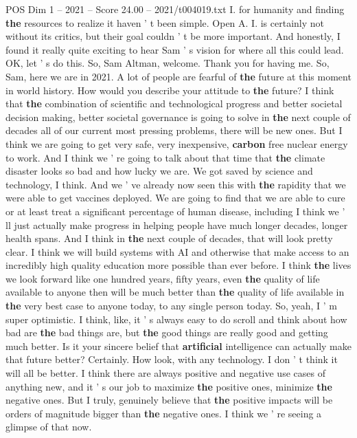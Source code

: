 \begin{textsample}{POS Dim 1 – 2021 – Score 24.00 – 2021/t004019.txt}
I. for humanity and finding \textbf{the} resources to realize it haven ' t been simple.
Open A.
I. is certainly not without its critics, but their goal couldn ' t be more important.
And honestly, I found it really quite exciting to hear Sam ' s vision for where all this could lead.
OK, let ' s do this.
So, Sam Altman, welcome.
Thank you for having me.
So, Sam, here we are in 2021.
A lot of people are fearful of \textbf{the} future at this moment in world history.
How would you describe your attitude to \textbf{the} future?
I think that \textbf{the} combination of scientific and technological progress and better societal decision making, better societal governance is going to solve in \textbf{the} next couple of decades all of our current most pressing problems, there will be new ones.
But I think we are going to get very safe, very inexpensive, \textbf{carbon} free nuclear energy to work.
And I think we ' re going to talk about that time that \textbf{the} climate disaster looks so bad and how lucky we are.
We got saved by science and technology, I think.
And we ' ve already now seen this with \textbf{the} rapidity that we were able to get vaccines deployed.
We are going to find that we are able to cure or at least treat a significant percentage of human disease, including I think we ' ll just actually make progress in helping people have much longer decades, longer health spans.
And I think in \textbf{the} next couple of decades, that will look pretty clear.
I think we will build systems with AI and otherwise that make access to an incredibly high quality education more possible than ever before.
I think \textbf{the} lives we look forward like one hundred years, fifty years, even \textbf{the} quality of life available to anyone then will be much better than \textbf{the} quality of life available in \textbf{the} very best case to anyone today, to any single person today.
So, yeah, I ' m super optimistic.
I think, like, it ' s always easy to do scroll and think about how bad are \textbf{the} bad things are, but \textbf{the} good things are really good and getting much better.
Is it your sincere belief that \textbf{artificial} intelligence can actually make that future better?
Certainly.
How look, with any technology.
I don ' t think it will all be better.
I think there are always positive and negative use cases of anything new, and it ' s our job to maximize \textbf{the} positive ones, minimize \textbf{the} negative ones.
But I truly, genuinely believe that \textbf{the} positive impacts will be orders of magnitude bigger than \textbf{the} negative ones.
I think we ' re seeing a glimpse of that now.

\end{textsample}
